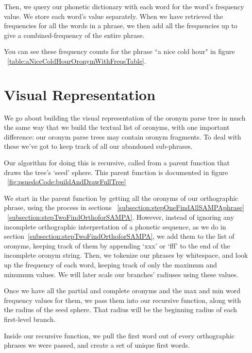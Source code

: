 Then, we query our phonetic dictionary with each word for the word's frequency value.  We store each word's value separately. When we have retrieved the frequencies for all the words in a phrase, we then add all the frequencies up to give a combined-frequency of the entire phrase.

You can see these frequency counts for the phrase ``a nice cold hour" in figure ~\ref{table:aNiceColdHourOronymWithFreqsTable}.




\section{Visual Representation}
\label{section:implementation:visualRepresentation}

We go about building the visual representation of the oronym parse tree in much the same way that we build the textual list of oronyms, with one important difference: our oronym parse trees may contain oronym fragments.   To deal with these we've got to keep track of all our abandoned sub-phrases.

Our algorithm for doing this is recursive, called from a parent function that draws the tree's `seed' sphere. This parent function is documented in figure ~\ref{fig:psuedoCode:buildAndDrawFullTree}


We start in the parent function by getting all the oronyms of our orthographic phrase, using the process in sections  ~\ref{subsection:stepOneFindAllSAMPAphrase} ~\ref{subsection:stepTwoFindOrthoforSAMPA}.  However, instead of ignoring any incomplete orthographic interpretation of a phonetic sequence, as we do in section~\ref{subsection:stepTwoFindOrthoforSAMPA}, we add them to the list of oronyms, keeping track of them by appending `xxx' or `fff' to the end of the incomplete  oronym string.  Then, we tokenize our phrases by whitespace, and look up the frequency of each word, keeping track of only the maximum and minumum values.  We will later scale our branches' radiuses using these values.

Once we have all the partial and complete oronyms and the max and min word frequency values for them, we pass them into our recursive function, along with the radius of the seed sphere.  That radius will be the beginning radius of each first-level branch.  

Inside our recursive function, we pull the first word out of every orthographic phrases we were passed, and create a set of unique first words.  

